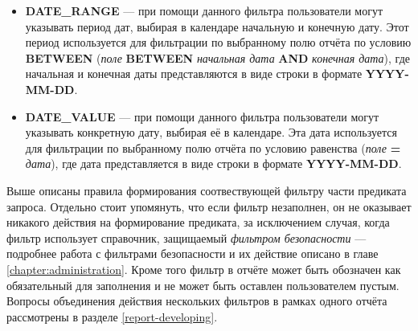 \documentclass[../user-manual.tex]{subfiles}
\begin{document}
\begin{itemize}
		\item \textbf{DATE\_RANGE} --- при помощи данного фильтра пользователи могут указывать период дат, выбирая в календаре начальную и конечную дату. Этот период используется для фильтрации по выбранному полю отчёта по условию \textbf{BETWEEN} (\textit{поле} \textbf{BETWEEN} \textit{начальная дата} \textbf{AND} \textit{конечная дата}), где начальная и конечная даты представляются в виде строки в формате \textbf{YYYY-MM-DD}.
		
		\item \textbf{DATE\_VALUE}	--- при помощи данного фильтра пользователи могут указывать конкретную дату, выбирая её в календаре. Эта дата используется для фильтрации по выбранному полю отчёта по условию равенства (\textit{поле} \textbf{=} \textit{дата}), где дата представляется в виде строки в формате \textbf{YYYY-MM-DD}.
		
	\end{itemize}

	Выше описаны правила формирования соотвествующей фильтру части предиката запроса. Отдельно стоит упомянуть, что если фильтр незаполнен, он не оказывает никакого действия на формирование предиката, за исключением случая, когда фильтр использует справочник, защищаемый \textit{фильтром безопасности} --- подробнее работа с фильтрами безопасности и их действие описано в главе \ref{chapter:administration}. Кроме того фильтр в отчёте может быть обозначен как обязательный для заполнения и не может быть оставлен пользователем пустым. Вопросы объединения действия нескольких фильтров в рамках одного отчёта рассмотрены в разделе \ref{report-developing}.
\end{document}
